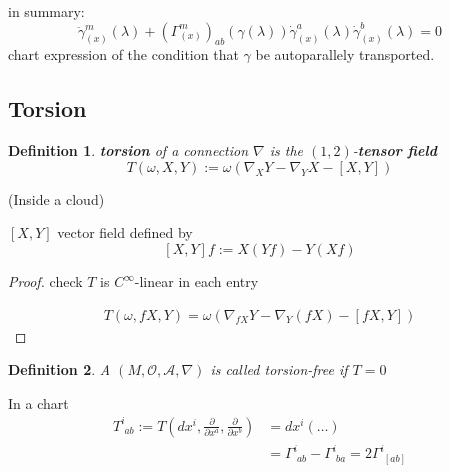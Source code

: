 \documentclass[10pt]{amsart}
\newtheorem{definition}{Definition}
\begin{document}
\begin{multicols*}{2}
	in summary:
\begin{equation}
\boxed{ 
	\ddot{\gamma}^m_{(x)}(\lambda) + (\Gamma^m_{(x)})_{ab}(\gamma(\lambda)) \dot{\gamma}^a_{(x)}(\lambda) \dot{\gamma}^b_{(x)}(\lambda) = 0  }
\end{equation}
chart expression of the condition that $\gamma$ be autoparallely transported.
	
	
	
	
	\subsection{Torsion}
	
	\begin{definition}
		\textbf{torsion} of a connection $\nabla$ is the $(1,2)$-\textbf{tensor field}
		\begin{equation}
		T(\omega,X,Y) := \omega( \nabla_X Y - \nabla_Y X - [X,Y])
		\end{equation}
	\end{definition}
	
	(Inside a cloud) 
	
	$[X,Y]$ vector field defined by 
	\[
	[X,Y]f:= X(Yf) - Y(Xf)
	\]
	
	\begin{proof}
		check $T$ is $C^{\infty}$-linear in each entry
		
		\[
		\begin{gathered}
		T(\omega, fX,Y) = \omega ( \nabla_{fX} Y - \nabla_Y (fX) - [fX,Y] )
		\end{gathered}
		\]
	\end{proof}
	
	\begin{definition}
		A $(M, \mathcal{O}, \mathcal{A}, \nabla)$ is called torsion-free if $T=0$
	\end{definition}
	
	In a chart 
	\[
	\begin{aligned}
	T^i_{ \, \, ab } := T\left(dx^i , \frac{ \partial }{ \partial x^a} , \frac{ \partial }{ \partial x^b}  \right) & = dx^i ( \dots ) \\ 
	& = \Gamma^i_{ \, \, ab} - \Gamma^i_{ \, \, ba} = 2 \Gamma^i_{ \, \, [ab] }
	\end{aligned}
	\]
	

\end{multicols*}
\end{document}

